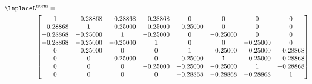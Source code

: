 \begin{align}
\laplaceL&^{\text{norm}} = \nonumber\\
&\begin{bmatrix}
1 & -0.28868 & -0.28868 & -0.28868 & 0 & 0 & 0 & 0 \\
-0.28868 &  1 & -0.25000 & -0.25000 & -0.25000 & 0 & 0 & 0 \\
-0.28868 & -0.25000 &  1 & -0.25000 & 0 & -0.25000 & 0 & 0 \\
-0.28868 & -0.25000 & -0.25000 &  1 & 0 & 0 & -0.25000 & 0 \\
0 & -0.25000 & 0 & 0 &  1 & -0.25000 & -0.25000 & -0.28868 \\
0 & 0 & -0.25000 & 0 & -0.25000 &  1 & -0.25000 & -0.28868 \\
0 & 0 & 0 & -0.25000 & -0.25000 & -0.25000 &  1 & -0.28868 \\
0 & 0 & 0 & 0 & -0.28868 & -0.28868 & -0.28868 &  1
\end{bmatrix}
\end{align}
